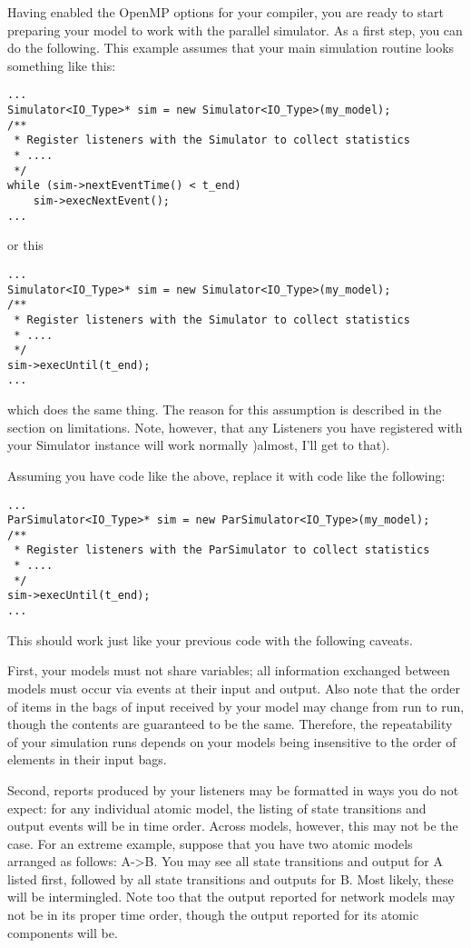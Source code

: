 Having enabled the OpenMP options for your compiler, you are ready to start preparing your model to work with the parallel simulator. As a first step, you can do the following. This example assumes that your main simulation routine looks something like this:
\begin{verbatim}
...
Simulator<IO_Type>* sim = new Simulator<IO_Type>(my_model);
/**
 * Register listeners with the Simulator to collect statistics
 * ....
 */
while (sim->nextEventTime() < t_end)
    sim->execNextEvent();
...
\end{verbatim}
or this
\begin{verbatim}
...
Simulator<IO_Type>* sim = new Simulator<IO_Type>(my_model);
/**
 * Register listeners with the Simulator to collect statistics
 * ....
 */
sim->execUntil(t_end);
...
\end{verbatim}
which does the same thing. The reason for this assumption is described in the section on limitations. Note, however, that any Listeners you have registered with your Simulator instance will work normally )almost, I'll get to that).

Assuming you have code like the above, replace it with code like the following:
\begin{verbatim}
...
ParSimulator<IO_Type>* sim = new ParSimulator<IO_Type>(my_model);
/**
 * Register listeners with the ParSimulator to collect statistics
 * ....
 */
sim->execUntil(t_end);
...
\end{verbatim}
This should work just like your previous code with the following caveats.

First, your models must not share variables; all information exchanged between models must occur via events at their input and output. Also note that the order of items in the bags of input received by your model may change from run to run, though the contents are guaranteed to be the same. Therefore, the repeatability of your simulation runs depends on your models being insensitive to the order of elements in their input bags.

Second, reports produced by your listeners may be formatted in ways you do not expect: for any individual atomic model, the listing of state transitions and output events will be in time order. Across models, however, this may not be the case. For an extreme example, suppose that you have two atomic models arranged as follows: A->B. You may see all state transitions and output for A listed first, followed by all state transitions and outputs for B. Most likely, these will be intermingled. Note too that the output reported for network models may not be in its proper time order, though the output reported for its atomic components will be.

